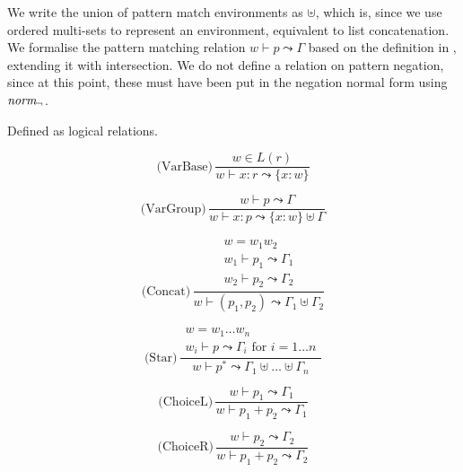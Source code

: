 We write the union of pattern match environments as $\uplus$, which is, since we
use ordered multi-sets to represent an environment, equivalent to list
concatenation. We formalise the pattern matching relation $w \vdash p \leadsto
\Gamma$ based on the definition in \cite{pdpat}, extending it with
intersection. We do not define a relation on pattern negation, since at this
point, these must have been put in the negation normal form using $\mathit{norm_\neg}$.

\begin{defn}
   Defined as logical relations.

   \begin{minipage}{0.4\textwidth}
      \[\text{(VarBase)}\, \frac
         {w \in L(r)}
         {w \vdash x : r \leadsto \{x : w\}}
      \]
   \end{minipage}
   \begin{minipage}{0.5\textwidth}
      \[\text{(VarGroup)}\, \frac
         {w \vdash p \leadsto \Gamma}
         {w \vdash x : p \leadsto \{x : w\} \uplus \Gamma}
      \]
   \end{minipage}

   \needspace{3cm}
   \begin{minipage}{0.4\textwidth}
      \[\text{(Concat)}\, \frac
         {\begin{array}{c}
            w = w_1 w_2 \\
            w_1 \vdash p_1 \leadsto \Gamma_1 \\
            w_2 \vdash p_2 \leadsto \Gamma_2
         \end{array}}     
         {w \vdash (p_1, p_2) \leadsto \Gamma_1 \uplus \Gamma_2}
      \]
   \end{minipage}
   \begin{minipage}{0.5\textwidth}
      \[\text{(Star)}\, \frac
         {\begin{array}{c}
            w = w_1 \dots w_n \\
            w_i \vdash p \leadsto \Gamma_i \text{ for } i = 1 \dots n
         \end{array}}     
         {w \vdash p^* \leadsto \Gamma_1 \uplus \dots \uplus \Gamma_n}
      \]
   \end{minipage}

   \begin{minipage}{0.4\textwidth}
      \[\text{(ChoiceL)}\, \frac
         {w \vdash p_1 \leadsto \Gamma_1}
         {w \vdash p_1 + p_2 \leadsto \Gamma_1}
      \]
   \end{minipage}
   \begin{minipage}{0.4\textwidth}
      \[\text{(ChoiceR)}\, \frac
         {w \vdash p_2 \leadsto \Gamma_2}
         {w \vdash p_1 + p_2 \leadsto \Gamma_2}
      \]
   \end{minipage}


\end{defn}
